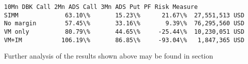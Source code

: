 \documentclass[11pt]{article}
\makeatletter
\newcommand{\boxspacing}{\kern\kvtcb@left@rule\kern\kvtcb@boxsep}
\newcommand{\prompt}[4]{
        \ttfamily\llap{{\color{#2}[#3]:\hspace{3pt}#4}}\vspace{-\baselineskip}
    }
\makeatother
\begin{document}
            \begin{tcolorbox}[breakable, size=fbox, boxrule=.5pt, pad at break*=1mm, opacityfill=0]
\prompt{Out}{outcolor}{22}{\boxspacing}
\begin{Verbatim}[commandchars=\\\{\}]
          10Mn DBK Call 2Mn ADS Call 3Mn ADS Put PF Risk Measure
SIMM             63.10\%       15.23\%      21.67\%  27,551,513 USD
No margin        57.45\%       33.16\%       9.39\%  76,295,560 USD
VM only          80.79\%       44.65\%     -25.44\%  10,230,051 USD
VM+IM           106.19\%       86.85\%     -93.04\%   1,847,365 USD
\end{Verbatim}
\end{tcolorbox}
        
    Further analysis of the results shown above may be found in section


    
    
    
\end{document}
